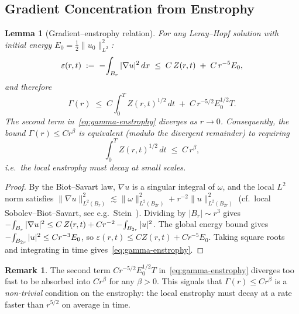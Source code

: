 \documentclass[11pt]{article}
\newtheorem{lemma}[theorem]{Lemma}
\theoremstyle{definition}
\newtheorem{remark}[theorem]{Remark}
\theoremstyle{remark}
\newcommand{\grad}{\nabla}
\newcommand{\dx}{\,dx}
\newcommand{\dt}{\,dt}
\newcommand{\Xint}{\mathop{\mathchoice{\vcenter{\hbox{$\displaystyle-$}}}%
  {\vcenter{\hbox{$\textstyle-$}}}%
  {\vcenter{\hbox{$\scriptstyle-$}}}%
  {\vcenter{\hbox{$\scriptscriptstyle-$}}}}\!\int}
\begin{document}
\subsection{Gradient Concentration from Enstrophy}
\label{subsec:gradient-enstrophy}

\begin{lemma}[Gradient--enstrophy relation]\label{lem:gradient-enstrophy}
For any Leray--Hopf solution with initial energy $E_0 = \tfrac{1}{2}\|u_0\|_{L^2}^2$:
\begin{equation}\label{eq:grad-enstrophy}
  \varepsilon(r,t) \;:=\; \Xint_{B_r} |\grad u|^2 \dx
  \;\leq\; C\,Z(r,t) \;+\; C\,r^{-5} E_0,
\end{equation}
and therefore
\begin{equation}\label{eq:gamma-enstrophy}
  \Gamma(r) \;\leq\; C\int_0^T Z(r,t)^{1/2}\dt \;+\; C\,r^{-5/2} E_0^{1/2} T.
\end{equation}
The second term in~\eqref{eq:gamma-enstrophy} diverges as $r\to 0$.
Consequently, the bound $\Gamma(r)\leq C r^\beta$ is equivalent
(modulo the divergent remainder) to requiring
\begin{equation}\label{eq:enstrophy-decay-target}
  \int_0^T Z(r,t)^{1/2}\dt \;\leq\; C\,r^\beta,
\end{equation}
i.e.\ the \emph{local enstrophy must decay at small scales}.
\end{lemma}

\begin{proof}
By the Biot--Savart law, $\grad u$ is a singular integral of $\omega$,
and the local $L^2$ norm satisfies
$\|\grad u\|_{L^2(B_r)}^2 \lesssim \|\omega\|_{L^2(B_{2r})}^2
+ r^{-2}\|u\|_{L^2(B_{2r})}^2$
(cf.\ local Sobolev--Biot--Savart, see e.g.\ Stein~\cite{Stein1970}).
Dividing by $|B_r| \sim r^3$ gives
$\Xint_{B_r}|\grad u|^2 \leq C\,Z(r,t) + Cr^{-2}\Xint_{B_{2r}}|u|^2$.
The global energy bound gives $\Xint_{B_{2r}}|u|^2 \leq C r^{-3} E_0$,
so $\varepsilon(r,t) \leq C Z(r,t) + C r^{-5} E_0$.
Taking square roots and integrating in time gives~\eqref{eq:gamma-enstrophy}.
\end{proof}

\begin{remark}
The second term $C r^{-5/2} E_0^{1/2} T$ in~\eqref{eq:gamma-enstrophy}
diverges too fast to be absorbed into $C r^\beta$ for any $\beta > 0$.
This signals that $\Gamma(r) \leq C r^\beta$ is a \emph{non-trivial}
condition on the enstrophy: the local enstrophy must decay at a rate
faster than $r^{5/2}$ on average in time.
\end{remark}
\end{document}
